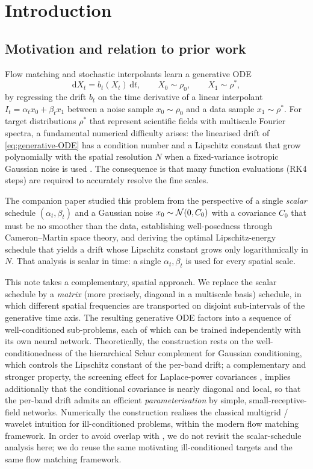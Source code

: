 \documentclass[11pt]{amsart}
\newcommand{\rd}{\mathrm{d}}
\theoremstyle{remark}
\numberwithin{equation}{section}
\begin{document}
\section{Introduction}
\subsection{Motivation and relation to prior work}
Flow matching and stochastic interpolants \cite{lipman2022flow,liu2022flow,albergo2023building,albergo2023stochastic} learn a generative ODE
\begin{equation}
\label{eq:generative-ODE}
 \rd X_t = b_t(X_t)\,\rd t,\qquad X_0\sim\rho_0,\qquad X_1\sim\rho^*,
\end{equation}
by regressing the drift $b_t$ on the time derivative of a linear interpolant $I_t=\alpha_t x_0+\beta_t x_1$ between a noise sample $x_0\sim\rho_0$ and a data sample $x_1\sim\rho^*$. For target distributions $\rho^*$ that represent scientific fields with multiscale Fourier spectra, a fundamental numerical difficulty arises: the linearised drift of \eqref{eq:generative-ODE} has a condition number and a Lipschitz constant that grow polynomially with the spatial resolution $N$ when a fixed-variance isotropic Gaussian noise is used \cite{chen2025scale}. The consequence is that many function evaluations (RK4 steps) are required to accurately resolve the fine scales.

The companion paper \cite{chen2025scale} studied this problem from the perspective of a single \emph{scalar} schedule $(\alpha_t,\beta_t)$ and a Gaussian noise $x_0\sim\mathcal{N}(0,C_0)$ with a covariance $C_0$ that must be no smoother than the data, establishing well-posedness through Cameron--Martin space theory, and deriving the optimal Lipschitz-energy schedule that yields a drift whose Lipschitz constant grows only logarithmically in $N$. That analysis is scalar in time: a single $\alpha_t,\beta_t$ is used for every spatial scale.

This note takes a complementary, spatial approach. We replace the scalar schedule by a \emph{matrix} (more precisely, diagonal in a multiscale basis) schedule, in which different spatial frequencies are transported on disjoint sub-intervals of the generative time axis. The resulting generative ODE factors into a sequence of well-conditioned sub-problems, each of which can be trained independently with its own neural network. Theoretically, the construction rests on the well-conditionedness of the hierarchical Schur complement for Gaussian conditioning, which controls the Lipschitz constant of the per-band drift; a complementary and stronger property, the screening effect for Laplace-power covariances \cite{chen2021consistency,owhadi2019operator,stein2002screening}, implies additionally that the conditional covariance is nearly diagonal and local, so that the per-band drift admits an efficient \emph{parameterisation} by simple, small-receptive-field networks. Numerically the construction realises the classical multigrid / wavelet intuition for ill-conditioned problems, within the modern flow matching framework. In order to avoid overlap with \cite{chen2025scale}, we do not revisit the scalar-schedule analysis here; we do reuse the same motivating ill-conditioned targets and the same flow matching framework.
\end{document}
